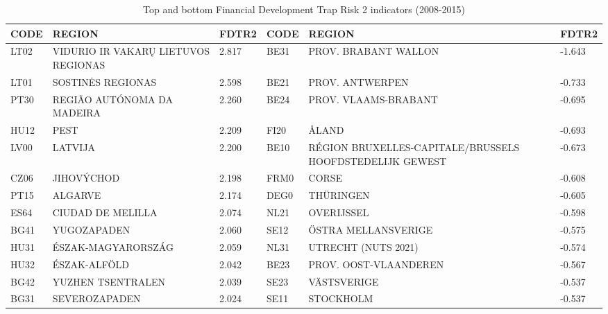 \documentclass[a4paper,11pt,oneside]{article}
\begin{document}
\begin{table}%
\centering
\caption{Top and bottom Financial Development Trap Risk 2 indicators (2008-2015)}
\label{tbl:top_bottom_fdtr2_2008_2015}
\footnotesize
\begin{tabular}{llllll}
\toprule
CODE & REGION                              & FDTR2 & CODE & REGION   & FDTR2  \\
\midrule
LT02 & VIDURIO IR VAKARŲ LIETUVOS REGIONAS & 2.817 & BE31 & PROV. BRABANT WALLON                                        & -1.643 \\
LT01 & SOSTINĖS REGIONAS                   & 2.598 & BE21 & PROV. ANTWERPEN                                             & -0.733 \\
PT30 & REGIÃO AUTÓNOMA DA MADEIRA          & 2.260 & BE24 & PROV. VLAAMS-BRABANT                                        & -0.695 \\
HU12 & PEST                                & 2.209 & FI20 & ÅLAND                                                       & -0.693 \\
LV00 & LATVIJA                             & 2.200 & BE10 & RÉGION BRUXELLES-CAPITALE/BRUSSELS HOOFDSTEDELIJK GEWEST & -0.673 \\
CZ06 & JIHOVÝCHOD                          & 2.198 & FRM0 & CORSE                                                       & -0.608 \\
PT15 & ALGARVE                             & 2.174 & DEG0 & THÜRINGEN                                                   & -0.605 \\
ES64 & CIUDAD DE MELILLA                   & 2.074 & NL21 & OVERIJSSEL                                                  & -0.598 \\
BG41 & YUGOZAPADEN                         & 2.060 & SE12 & ÖSTRA MELLANSVERIGE                                         & -0.575 \\
HU31 & ÉSZAK-MAGYARORSZÁG                  & 2.059 & NL31 & UTRECHT (NUTS 2021)                                         & -0.574 \\
HU32 & ÉSZAK-ALFÖLD                        & 2.042 & BE23 & PROV. OOST-VLAANDEREN                                       & -0.567 \\
BG42 & YUZHEN TSENTRALEN                   & 2.039 & SE23 & VÄSTSVERIGE                                                 & -0.537 \\
BG31 & SEVEROZAPADEN                       & 2.024 & SE11 & STOCKHOLM                                                   & -0.537 \\

\end{tabular}
\end{table}
\end{document}
